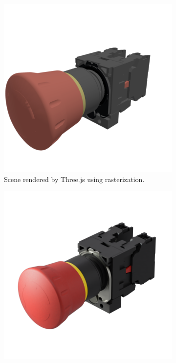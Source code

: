 \begin{figure}[H]
  \centering
  \begin{subfigure}[t]{0.3\textwidth}
      \includegraphics[width=\textwidth]{resources/comparison-three-js.png}
      \caption{Scene rendered by \gls{Three.js} using rasterization.}
      \label{fig:rasterization-rendering}
  \end{subfigure}
  \hfill
  \begin{subfigure}[t]{0.3\textwidth}
    \includegraphics[width=\textwidth]{resources/comparison-offline-rendering.png}

\end{subfigure}
\end{figure}
